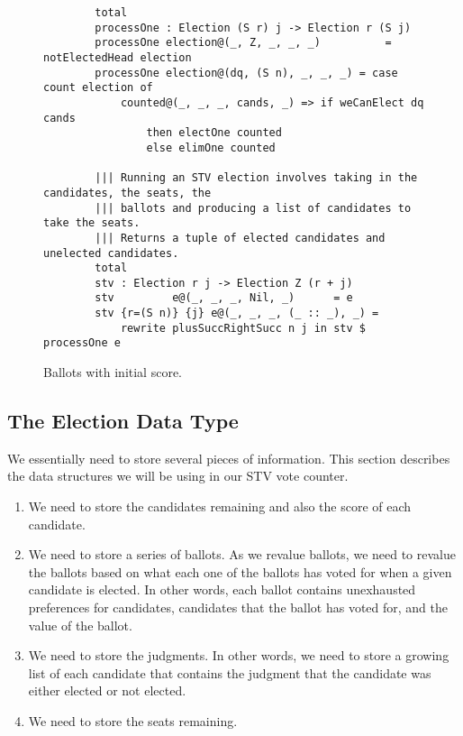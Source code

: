 \begin{figure}[ht!!!!!!!!]
    \caption{Ballots with initial score.}
    \label{overall_code}
    \begin{lstlisting}
        total
        processOne : Election (S r) j -> Election r (S j)
        processOne election@(_, Z, _, _, _)          = notElectedHead election
        processOne election@(dq, (S n), _, _, _) = case count election of
            counted@(_, _, _, cands, _) => if weCanElect dq cands
                then electOne counted
                else elimOne counted

        ||| Running an STV election involves taking in the candidates, the seats, the
        ||| ballots and producing a list of candidates to take the seats. 
        ||| Returns a tuple of elected candidates and unelected candidates.
        total
        stv : Election r j -> Election Z (r + j)
        stv         e@(_, _, _, Nil, _)      = e
        stv {r=(S n)} {j} e@(_, _, _, (_ :: _), _) = 
            rewrite plusSuccRightSucc n j in stv $ processOne e
    \end{lstlisting}
\end{figure}

\subsection{The Election Data Type}

We essentially need to store several pieces of information. This section
describes the data structures we will be using in our STV vote counter. 

\begin{enumerate}
    \item We need to store the candidates remaining and also the score of each
    candidate. 
    \item We need to store a series of ballots. As we revalue ballots, we need
    to revalue the ballots based on what each one of the ballots has voted for
    when a given candidate is elected. In other words, each ballot contains
    unexhausted preferences for candidates, candidates that the ballot has voted
    for, and the value of the ballot. 
    \item We need to store the judgments. In other words, we need to store a
    growing list of each candidate that contains the judgment that the candidate
    was either elected or not elected. 
    \item We need to store the seats remaining.
\end{enumerate}

